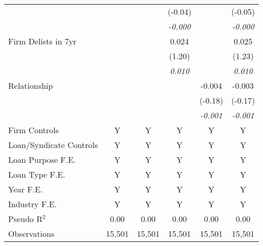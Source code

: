 {\begin{tabular}{l*{5}{c}}
                &                  &                  &  (-0.04)         &                  &  (-0.05)         \\
                &                  &                  &\textit{-0.000}         &                  &\textit{-0.000}         \\
Firm Delists in 7yr&                  &                  &    0.024         &                  &    0.025         \\
                &                  &                  &   (1.20)         &                  &   (1.23)         \\
                &                  &                  &\textit{0.010}         &                  &\textit{0.010}         \\
Relationship    &                  &                  &                  &   -0.004         &   -0.003         \\
                &                  &                  &                  &  (-0.18)         &  (-0.17)         \\
                &                  &                  &                  &\textit{-0.001}         &\textit{-0.001}         \\
\addlinespace \midrule Firm Controls   &        Y         &        Y         &        Y         &        Y         &        Y         \\
Loan/Syndicate Controls&        Y         &        Y         &        Y         &        Y         &        Y         \\
Loan Purpose F.E.&        Y         &        Y         &        Y         &        Y         &        Y         \\
Loan Type F.E.  &        Y         &        Y         &        Y         &        Y         &        Y         \\
Year F.E.       &        Y         &        Y         &        Y         &        Y         &        Y         \\
Industry F.E.   &        Y         &        Y         &        Y         &        Y         &        Y         \\

Pseudo R$ ^2 $  &     0.00         &     0.00         &     0.00         &     0.00         &     0.00         \\
Observations    &   15,501         &   15,501         &   15,501         &   15,501         &   15,501         \\
\bottomrule
\end{tabular}
}
